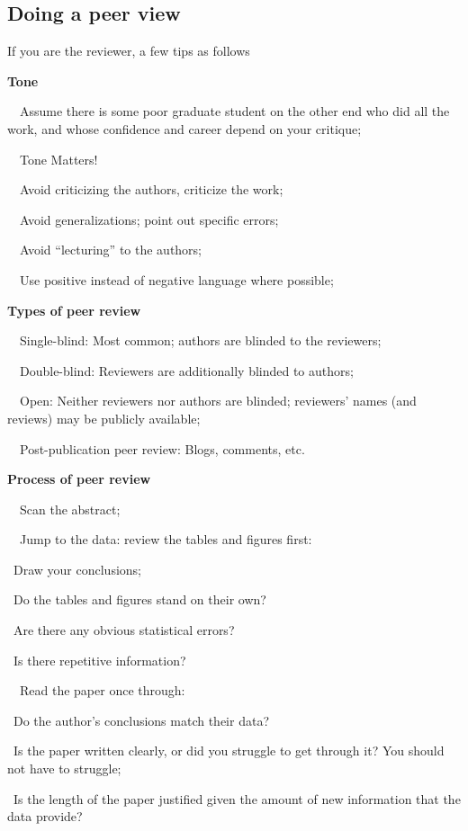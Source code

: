 \documentclass[a4paper, 12pt]{article}
\begin{document}
\newpage\subsection{Doing a peer view}

If you are the reviewer, a few tips as follows

\textbf{Tone}
\par\ \textbullet\ Assume there is some poor graduate student on the other end who did all the work, and whose confidence and career depend on your critique;
\par\ \textbullet\ Tone Matters!
\par\ \textbullet\ Avoid criticizing the authors, criticize the work;
\par\ \textbullet\ Avoid generalizations; point out specific errors;
\par\ \textbullet\ Avoid ``lecturing'' to the authors;
\par\ \textbullet\ Use positive instead of negative language where possible;

\textbf{Types of peer review}
\par\ \textbullet\ Single-blind: Most common; authors are blinded to the reviewers;
\par\ \textbullet\ Double-blind: Reviewers are additionally blinded to authors;
\par\ \textbullet\ Open: Neither reviewers nor authors are blinded; reviewers' names (and reviews) may be publicly available;
\par\ \textbullet\ Post-publication peer review: Blogs, comments, etc.

\textbf{Process of peer review}

\par\ \textbullet\ Scan the abstract;

\par\ \textbullet\ Jump to the data: review the tables and figures first:
\par\quad\textopenbullet\ Draw your conclusions;
\par\quad\textopenbullet\ Do the tables and figures stand on their own?
\par\quad\textopenbullet\ Are there any obvious statistical errors?
\par\quad\textopenbullet\ Is there repetitive information?

\newpage\par\ \textbullet\ Read the paper once through:
\par\quad\textopenbullet\ Do the author's conclusions match their data?
\par\quad\textopenbullet\ Is the paper written clearly, or did you struggle to get through it? You should not have to struggle;
\par\quad\textopenbullet\ Is the length of the paper justified given the amount of new information that the data provide?
\end{document}

